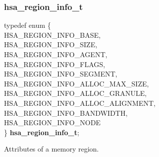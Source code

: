 \documentclass[final]{book}
\newcommand{\reftyp}[1]{#1}
\newcommand{\refenu}[1]{\reftyp{#1}}
\newenvironment{mylongtable}{\rowcolors{0}{lightgray}{lightgray}\longtable} {
\endlongtable}
\begin{document}
\subsubsection{hsa_\-region_\-info_\-t}
\vspace{-5.5mm}\begin{mylongtable}{@{}p{\textwidth}}
\rule{0pt}{3ex}typedef enum \{\\\hspace{1.7em}\hypertarget{group__memory_1ggad35755078ff15f645c6c25e7f7ef2707af5033c8ce5609f9055ae0624e04d1c83}{\refenu{HSA_\-REGION_\-INFO_\-BASE}},\\
\hspace{1.7em}\hypertarget{group__memory_1ggad35755078ff15f645c6c25e7f7ef2707a09403f5c83497726504523694b3e86b6}{\refenu{HSA_\-REGION_\-INFO_\-SIZE}},\\
\hspace{1.7em}\hypertarget{group__memory_1ggad35755078ff15f645c6c25e7f7ef2707a92bbdc9ec69d5ed54ea37b4b5c3be58e}{\refenu{HSA_\-REGION_\-INFO_\-AGENT}},\\
\hspace{1.7em}\hypertarget{group__memory_1ggad35755078ff15f645c6c25e7f7ef2707a97869505d019b0800355cab4a21c3403}{\refenu{HSA_\-REGION_\-INFO_\-FLAGS}},\\
\hspace{1.7em}\hypertarget{group__memory_1ggad35755078ff15f645c6c25e7f7ef2707ab2701b5deebcf46596e8f070f6ef27b6}{\refenu{HSA_\-REGION_\-INFO_\-SEGMENT}},\\
\hspace{1.7em}\hypertarget{group__memory_1ggad35755078ff15f645c6c25e7f7ef2707ab846101a22f46f61e0caf1d73cedd414}{\refenu{HSA_\-REGION_\-INFO_\-ALLOC_\-MAX_\-SIZE}},\\
\hspace{1.7em}\hypertarget{group__memory_1ggad35755078ff15f645c6c25e7f7ef2707ab602c01f90962314de88fb887b6f13b3}{\refenu{HSA_\-REGION_\-INFO_\-ALLOC_\-GRANULE}},\\
\hspace{1.7em}\hypertarget{group__memory_1ggad35755078ff15f645c6c25e7f7ef2707af3103bc1328080b236a7847f1bf4998e}{\refenu{HSA_\-REGION_\-INFO_\-ALLOC_\-ALIGNMENT}},\\
\hspace{1.7em}\hypertarget{group__memory_1ggad35755078ff15f645c6c25e7f7ef2707a77389057885a6a331863536fe4c66a5c}{\refenu{HSA_\-REGION_\-INFO_\-BANDWIDTH}},\\
\hspace{1.7em}\hypertarget{group__memory_1ggad35755078ff15f645c6c25e7f7ef2707ab7bb10ceec7634e32c7ad29e6b4a31a0}{\refenu{HSA_\-REGION_\-INFO_\-NODE}}\\
\} \hypertarget{group__memory_1gad35755078ff15f645c6c25e7f7ef2707}{\textbf{hsa_\-region_\-info_\-t}};\rule[-2ex]{0pt}{0pt}\end{mylongtable}
\vspace{-2mm}Attributes of a memory region.
\end{document}
